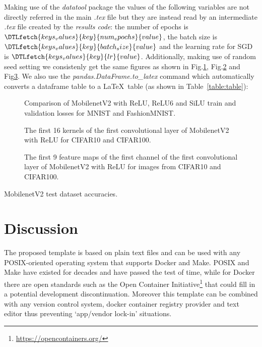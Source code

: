 \documentclass[journal]{IEEEtran}
\begin{document}
Making use of the \textit{datatool} package the values of the following variables are not directly referred in the main \textit{.tex} file but they are instead read by an intermediate \textit{.tex} file created by the \textit{results code}: the number of epochs is $\DTLfetch{keys_values}{key}{num_epochs}{value}$, the batch size is $\DTLfetch{keys_values}{key}{batch_size}{value}$ and the learning rate for SGD is $\DTLfetch{keys_values}{key}{lr}{value}$. Additionally, making use of random seed setting we consistenly get the same figures as shown in Fig.\ref{fig:loss}, Fig.\ref{fig:kernels} and Fig\ref{fig:featuremaps}.
We also use the \textit{pandas.DataFrame.to\_latex} command which automatically converts a dataframe table to a \LaTeX\ table (as shown in Table~\ref{table:table}):

\begin{figure}[!t]
	\caption{Comparison of MobilenetV2 with ReLU, ReLU6 and SiLU train and validation losses for MNIST and FashionMNIST.}
	\label{fig:loss}
\end{figure}

\begin{figure}[!t]
	\caption{The first 16 kernels of the first convolutional layer of MobilenetV2 with ReLU for CIFAR10 and CIFAR100.}
	\label{fig:kernels}
\end{figure}

\begin{figure}[!t]
	\caption{The first 9 feature maps of the first channel of the first convolutional layer of MobilenetV2 with ReLU for images from CIFAR10 and CIFAR100.}
	\label{fig:featuremaps}
\end{figure}

\begin{table}[h]
	\centering
	\caption{MobilenetV2 test dataset accuracies.}
	\label{table:table}
	\setlength\tabcolsep{2pt}
	
\end{table}

\section{Discussion}
The proposed template is based on plain text files and can be used with any POSIX-oriented operating system that supports Docker and Make.
POSIX and Make have existed for decades and have passed the test of time, while for Docker there are open standards such as the Open Container Initiative\footnote{\url{https://opencontainers.org/}} that could fill in a potential development discontinuation.
Moreover this template can be combined with any version control system, docker container registry provider and text editor thus preventing `app/vendor lock-in' situations.
\end{document}
